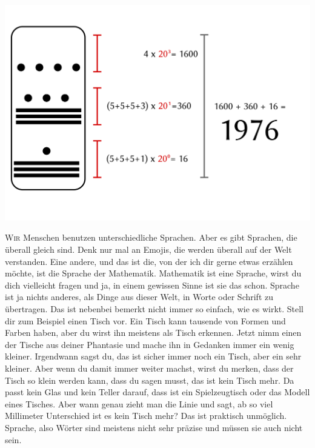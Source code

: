 ﻿\thispagestyle{empty}
\begin{center}
\includegraphics[width=\textwidth]{./bilder/Maya1976.png}
\end{center}
\vspace*{\fill}
{\centering\fontsize{50}{48} \color{farbe}\par}
\newpage
\lettrine[lines=3, lhang=.2, loversize=.25, lraise=0.05, findent=0.1em,nindent=0em]{W}{ir} Menschen benutzen unterschiedliche Sprachen. Aber es gibt Sprachen, die überall gleich sind. Denk nur mal an Emojis, die werden überall auf der Welt verstanden. Eine andere, und das ist die, von der ich dir gerne etwas erzählen möchte, ist die Sprache der Mathematik. Mathematik ist eine Sprache, wirst du dich vielleicht fragen und ja, in einem gewissen Sinne ist sie das schon. Sprache ist ja nichts anderes, als Dinge aus dieser Welt, in Worte oder Schrift zu übertragen. Das ist nebenbei bemerkt nicht immer so einfach, wie es wirkt. Stell dir zum Beispiel einen Tisch vor. Ein Tisch kann tausende von Formen und Farben haben, aber du wirst ihn meistens als Tisch erkennen. Jetzt nimm einen der Tische aus deiner Phantasie und mache ihn in Gedanken immer ein wenig kleiner. Irgendwann sagst du, das ist sicher immer noch ein Tisch, aber ein sehr kleiner. Aber wenn du damit immer weiter machst, wirst du merken, dass der Tisch so klein werden kann, dass du sagen musst, das ist kein Tisch mehr. Da passt kein Glas und kein Teller darauf, dass ist ein Spielzeugtisch oder das Modell eines Tisches. Aber wann genau zieht man die Linie und sagt, ab so viel Millimeter Unterschied ist es kein Tisch mehr? Das ist praktisch unmöglich. Sprache, also Wörter sind meistens nicht sehr präzise und müssen sie auch nicht sein.

